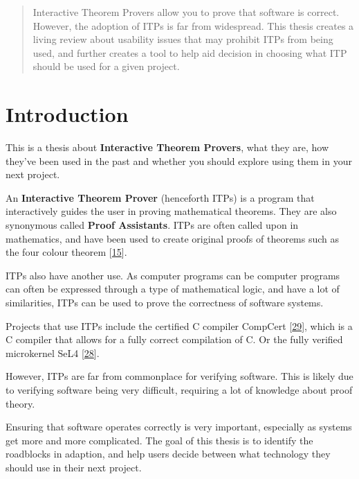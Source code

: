 \documentclass[
]{article}
\begin{document}
\newpage

\begin{abstract}
Interactive Theorem Provers allow you to prove that software is correct.
However, the adoption of ITPs is far from widespread. This thesis
creates a living review about usability issues that may prohibit ITPs
from being used, and further creates a tool to help aid decision in
choosing what ITP should be used for a given project.
\end{abstract}
\newpage

\tableofcontents
\newpage

\hypertarget{introduction}{%
\section{Introduction}\label{introduction}}

This is a thesis about \textbf{Interactive Theorem Provers}, what they
are, how they've been used in the past and whether you should explore
using them in your next project.

An \textbf{Interactive Theorem Prover} (henceforth ITPs) is a program
that interactively guides the user in proving mathematical theorems.
They are also synonymous called \textbf{Proof Assistants}. ITPs are
often called upon in mathematics, and have been used to create original
proofs of theorems such as the four colour theorem
{[}\protect\hyperlink{ref-four_colour_2008}{15}{]}.

ITPs also have another use. As computer programs can be computer
programs can often be expressed through a type of mathematical logic,
and have a lot of similarities, ITPs can be used to prove the
correctness of software systems.

Projects that use ITPs include the certified C compiler CompCert
{[}\protect\hyperlink{ref-leroy_formal_2009}{29}{]}, which is a C
compiler that allows for a fully correct compilation of C. Or the fully
verified microkernel SeL4
{[}\protect\hyperlink{ref-klein_sel4_2009}{28}{]}.

However, ITPs are far from commonplace for verifying software. This is
likely due to verifying software being very difficult, requiring a lot
of knowledge about proof theory.

Ensuring that software operates correctly is very important, especially
as systems get more and more complicated. The goal of this thesis is to
identify the roadblocks in adaption, and help users decide between what
technology they should use in their next project.
\end{document}
